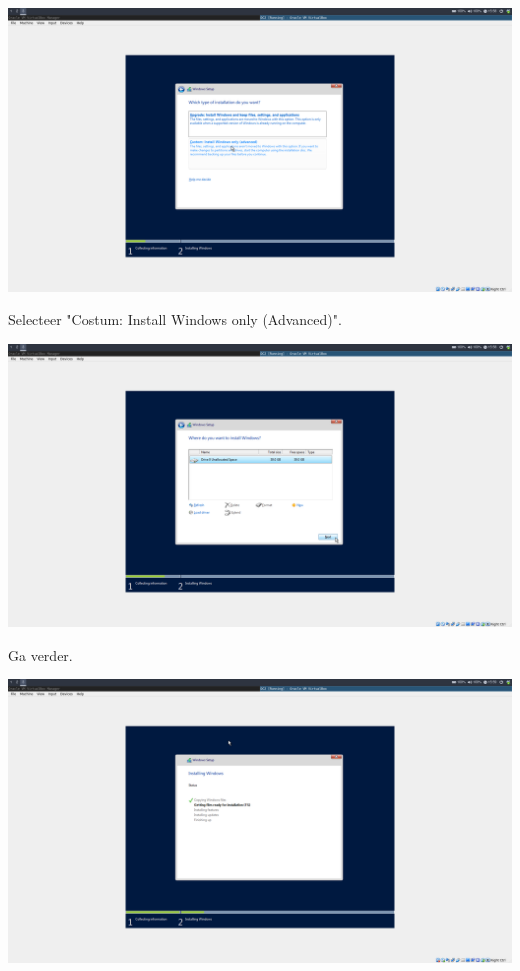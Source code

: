 \documentclass[a4paper]{article}
\begin{document}
\begin{center}
	\includegraphics[width=15cm]{Pictures/Windows_Install/1542293929.png}
	
	Selecteer "Costum: Install Windows only (Advanced)".
\end{center}
\begin{center}
	\includegraphics[width=15cm]{Pictures/Windows_Install/1542293934.png}
	
	Ga verder.
\end{center}
\begin{center}
	\includegraphics[width=15cm]{Pictures/Windows_Install/1542293945.png}
\end{center}
\end{document}
